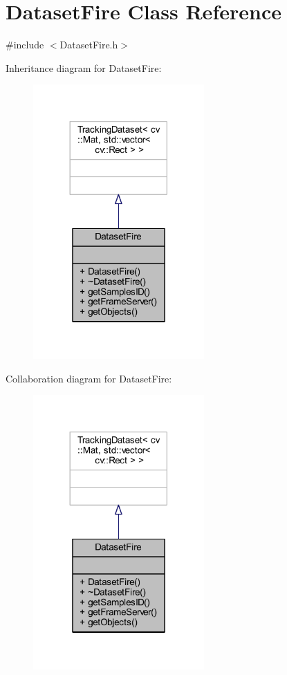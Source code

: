 \hypertarget{class_dataset_fire}{}\section{Dataset\+Fire Class Reference}
\label{class_dataset_fire}


{\ttfamily \#include $<$Dataset\+Fire.\+h$>$}



Inheritance diagram for Dataset\+Fire\+:
\nopagebreak
\begin{figure}[H]
\begin{center}
\leavevmode
\includegraphics[width=185pt]{class_dataset_fire__inherit__graph}
\end{center}
\end{figure}


Collaboration diagram for Dataset\+Fire\+:
\nopagebreak
\begin{figure}[H]
\begin{center}
\leavevmode
\includegraphics[width=185pt]{class_dataset_fire__coll__graph}
\end{center}
\end{figure}
